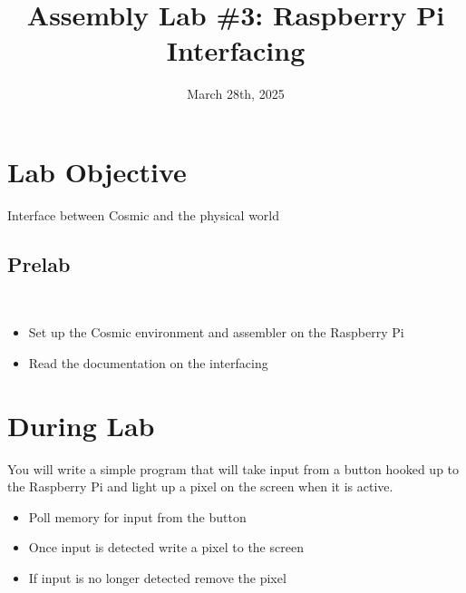\documentclass[
	12pt, %
]{fphw}
\title{Assembly Lab \#3: Raspberry Pi Interfacing} %
\date{March 28th, 2025} %
\institute{Elizabethtown College \\ Department of Computer Science} %
\begin{document}
\maketitle %


\section*{Lab Objective}

\begin{problem}
	Interface between Cosmic and the physical world 
\end{problem}


\subsection*{Prelab}\\

\begin{itemize}
  \item Set up the Cosmic environment and assembler on the Raspberry Pi
  \item Read the documentation on the interfacing
\end{itemize}


\section*{During Lab}

\begin{problem}
	You will write a simple program that will take input from a button hooked up to the Raspberry Pi and light up a pixel on the screen when it is active.
\end{problem}


\begin{itemize}
  \item Poll memory for input from the button
  \item Once input is detected write a pixel to the screen
  \item If input is no longer detected remove the pixel
\end{itemize}
\end{document}
